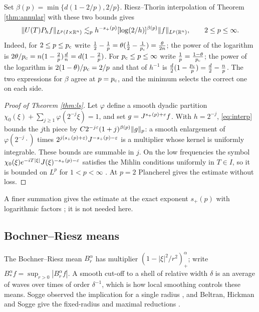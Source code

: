 Set $\beta(p)=\min\{d(1-2/p),2/p\}$. Riesz--Thorin interpolation \cite[Ch.~1]{Gra14} of Theorem
\ref{thm:annular} with these two bounds gives
\begin{equation}\label{eq:interp}
\|U(T)P_hf\|_{L^p(I\times\mathbb{R}^n)}\lesssim_ph^{-s_+(p)}[\log(2/h)]^{\beta(p)}\|f\|_{L^p(\mathbb{R}^n)},\qquad2\le p\le\infty .
\end{equation}
Indeed, for $2\le p\le p_{\mathrm c}$ write $\frac12-\frac1p=\theta(\frac12-\frac1{p_{\mathrm c}})=\frac\theta{2n}$; the power of the
logarithm is $2\theta/p_{\mathrm c}=n(1-\frac2p)\frac{d}{n}=d(1-\frac2p)$. For $p_{\mathrm c}\le p\le\infty$ write $\frac1p=\frac{1-\theta}{p_{\mathrm c}}$;
the power of the logarithm is $2(1-\theta)/p_{\mathrm c}=2/p$ and that of $h^{-1}$ is
$\frac d2(1-\frac{p_{\mathrm c}}p)=\frac d2-\frac np$. The two expressions for $\beta$ agree at $p=p_{\mathrm c}$, and the minimum
selects the correct one on each side.

\begin{proof}[Proof of Theorem \ref{thm:ls}]
Let $\varphi$ define a smooth dyadic partition $\chi_0(\xi)+\sum_{j\ge1}\varphi(2^{-j}\xi)=1$, and set
$g=J^{s_+(p)+\varepsilon}f$. With $h=2^{-j}$, \eqref{eq:interp} bounds the $j$th piece by
$C2^{-j\varepsilon}(1+j)^{\beta(p)}\|g\|_p$: a smooth enlargement of $\varphi(2^{-j}\cdot)$ times
$2^{j(s_+(p)+\varepsilon)}J^{-s_+(p)-\varepsilon}$ is a multiplier whose kernel is uniformly integrable. These
bounds are summable in $j$. On the low frequencies the symbol $\chi_0(\xi)e^{-iT|\xi|}J(\xi)^{-s_+(p)-\varepsilon}$
satisfies the Mihlin conditions uniformly in $T\in I$, so it is bounded on $L^p$ for $1<p<\infty$
\cite[Ch.~6]{Gra14}. At $p=2$ Plancherel gives the estimate without loss.
\end{proof}

A finer summation gives the estimate at the exact exponent $s_+(p)$ with logarithmic factors
\cite[Corollary 7.1]{OAI26}; it is not needed here.

\subsection{Bochner--Riesz means}\label{ssec:br}
The Bochner--Riesz mean $B^\alpha_r$ has multiplier $(1-|\xi|^2/r^2)^\alpha_+$; write
$B^\alpha_*f=\sup_{r>0}|B^\alpha_rf|$. A smooth cut-off to a shell of relative width $\delta$ is an
average of waves over times of order $\delta^{-1}$, which is how local smoothing controls these
means. Sogge observed the implication for a single radius \cite[(4.5)--(4.6)]{Sog91}, and Beltran,
Hickman and Sogge give the fixed-radius and maximal reductions \cite[Propositions 39 and 40]{BHS21}.

